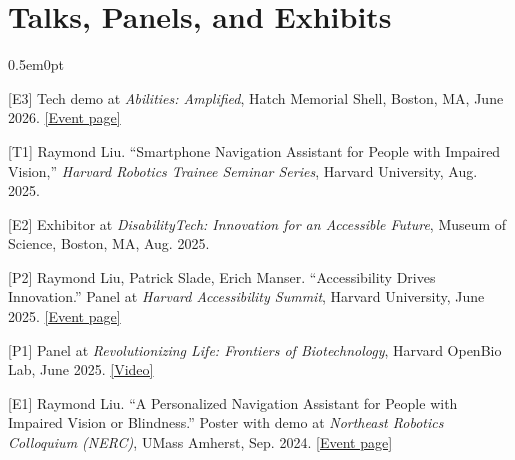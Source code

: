 \documentclass[letterpaper,11pt]{article}
\begin{document}
\vspace{-6pt}
\section{Talks, Panels, and Exhibits}
\begin{adjustwidth}{0.5em}{0pt}

[E3] Tech demo at \textit{Abilities: Amplified}, Hatch Memorial Shell, Boston, MA, June 2026. \href{https://events.seas.harvard.edu/event/abilities-amplified}{[Event page]}

[T1] Raymond Liu. ``Smartphone Navigation Assistant for People with Impaired Vision,'' \textit{Harvard Robotics Trainee Seminar Series}, Harvard University, Aug. 2025.

[E2] Exhibitor at \textit{DisabilityTech: Innovation for an Accessible Future}, Museum of Science, Boston, MA, Aug. 2025. %

[P2] Raymond Liu, Patrick Slade, Erich Manser. ``Accessibility Drives Innovation.'' Panel at \textit{Harvard Accessibility Summit}, Harvard University, June 2025. \href{https://accessibility.huit.harvard.edu/event/2025-accessibility-summit}{[Event page]}

[P1] Panel at \textit{Revolutionizing Life: Frontiers of Biotechnology}, Harvard OpenBio Lab, June 2025. \href{https://youtu.be/14_eO5z5slk?t=9369}{[Video]}%

[E1] Raymond Liu. ``A Personalized Navigation Assistant for People with Impaired Vision or Blindness.'' Poster with demo at \textit{Northeast Robotics Colloquium (NERC)}, UMass Amherst, Sep. 2024. \href{https://www.umass.edu/robotics/nerc2024/presenter-information}{[Event page]}

\end{adjustwidth}

\vspace{-4pt}
\end{document}
